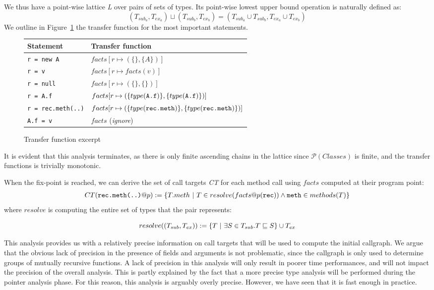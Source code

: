 We thus have a point-wise lattice \emph{L} over pairs of sets of types. Its
point-wise lowest upper bound operation is naturally defined as:
$$
    (T_{sub_a}, T_{ex_a}) \sqcup (T_{sub_b}, T_{ex_b}) = (T_{sub_a} \cup T_{sub_b}, T_{ex_a} \cup T_{ex_b})
$$
We outline in Figure~\ref{fig:ta:tf}
the transfer function for the most important statements.
\FloatBarrier
\begin{figure}[h]
    \centering

    \begin{tabular}{ l | l }
        Statement                 & Transfer function \\
        \hline
        \verb/r = new A/          & $facts[ r \mapsto (\{\}, \{ A \})]$ \\
        \verb/r = v/              & $facts[ r \mapsto facts(v)]$ \\
        \verb/r = null/           & $facts[ r \mapsto (\{\}, \{\})]$ \\
        \verb/r = A.f/            & $facts[ r \mapsto (\{type(\verb/A.f/)\}, \{type(\verb/A.f/)\}) ]$ \\
        \verb/r = rec.meth(..)/   & $facts[ r \mapsto (\{type(\verb/rec.meth/)\}, \{type(\verb/rec.meth/)\}) ]$ \\
        \verb/A.f = v/            & $facts$ (\emph{ignore}) \\
    \end{tabular}

    \caption{Transfer function excerpt}
    \label{fig:ta:tf}
\end{figure}

It is evident that this analysis terminates, as there is only finite ascending
chains in the lattice since $\mathcal{P}(Classes)$ is finite, and the transfer functions
is trivially monotonic.

When the fix-point is reached, we can derive the set of call targets \emph{CT}
for each method call using $facts$ computed at their program point:
\begin{eqnarray*}
    CT(\verb/rec.meth(..)/ @ p) := \{ T.meth ~|~ T \in resolve(facts@p(\verb/rec/)) \land \verb/meth/ \in methods(T) \}
\end{eqnarray*}
where $resolve$ is computing the entire set of types that the pair represents:

$$
resolve((T_{sub}, T_{ex})) := \{ T ~|~ \exists S \in T_{sub}. T \sqsubseteq S\} \cup T_{ex}
$$

This analysis provides us with a relatively precise information on call targets
that will be used to compute the initial callgraph. We argue that the obvious
lack of precision in the presence of fields and arguments is not problematic,
since the callgraph is only used to determine groups of mutually recursive
functions. A lack of precision in this analysis will only result in poorer time
performances, and will not impact the precision of the overall analysis. This
is partly explained by the fact that a more precise type analysis will be
performed during the pointer analysis phase. For this reason, this analysis is
arguably overly precise. However, we have seen that it is fast enough in
practice.
